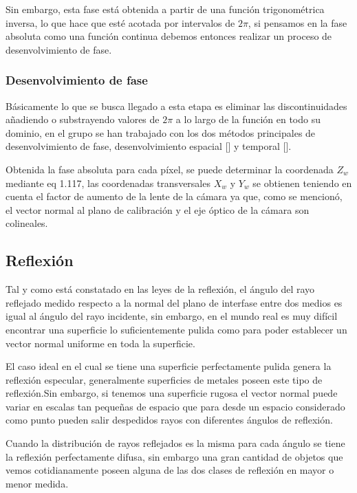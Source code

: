 \documentclass[UTF8]{article}
\begin{document}
Sin embargo, esta fase está obtenida a partir de una función trigonométrica inversa, lo que hace que esté acotada por intervalos de $2\pi$, si pensamos en la fase absoluta como una función continua debemos entonces realizar un proceso de desenvolvimiento de fase.

\subsubsection{Desenvolvimiento de fase}

Básicamente lo que se busca llegado a esta etapa es eliminar las discontinuidades añadiendo o substrayendo valores de $2\pi$ a lo largo de la función en todo su dominio, en el grupo se han trabajado con los dos métodos principales de desenvolvimiento de fase, desenvolvimiento espacial [] y temporal [].
\medskip

Obtenida la fase absoluta para cada píxel, se puede determinar la coordenada $Z_{w}$ mediante eq 1.117, las coordenadas transversales $X_{w}$ y $Y_{w}$ se obtienen teniendo en cuenta el factor de aumento de la lente de la cámara ya que, como se mencionó, el vector normal al plano de calibración y el eje óptico de la cámara son colineales.
\medskip

\subsection{Reflexión}

Tal y como está constatado en las leyes de la reflexión, el ángulo del rayo reflejado medido respecto a la normal del plano de interfase entre dos medios es igual al ángulo del rayo incidente, sin embargo, en el mundo real es muy difícil encontrar una superficie lo suficientemente pulida como para poder establecer un vector normal uniforme en toda la superficie.
\medskip

El caso ideal en el cual se tiene una superficie perfectamente pulida genera la reflexión especular, generalmente superficies de metales poseen este tipo de reflexión.Sin embargo, si tenemos una superficie rugosa el vector normal puede variar en escalas tan pequeñas de espacio que para desde un espacio considerado como punto pueden salir despedidos rayos con diferentes ángulos de reflexión.
\medskip

Cuando la distribución de rayos reflejados es la misma para cada ángulo se tiene la reflexión perfectamente difusa, sin embargo una gran cantidad de objetos que vemos cotidianamente poseen alguna de las dos clases de reflexión en mayor o menor medida.
\end{document}
